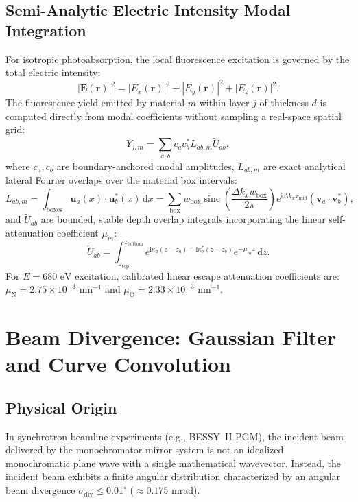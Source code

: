 \documentclass[11pt,a4paper]{article}
\newcommand{\E}{\mathbf{E}}
\newcommand{\ii}{\mathrm{i}}
\newcommand{\dd}{\mathrm{d}}
\begin{document}
\subsection{Semi-Analytic Electric Intensity Modal Integration}
For isotropic photoabsorption, the local fluorescence excitation is governed by the total electric intensity:
\begin{equation}
    |\E(\mathbf r)|^2 = |E_x(\mathbf r)|^2 + |E_y(\mathbf r)|^2 + |E_z(\mathbf r)|^2.
\end{equation}
The fluorescence yield emitted by material $m$ within layer $j$ of thickness $d$ is computed directly from modal coefficients without sampling a real-space spatial grid:
\begin{equation}
    Y_{j, m} = \sum_{a, b} c_a c_b^* L_{ab, m} \widetilde{U}_{ab},
\end{equation}
where $c_a, c_b$ are boundary-anchored modal amplitudes, $L_{ab, m}$ are exact analytical lateral Fourier overlaps over the material box intervals:
\begin{equation}
    L_{ab, m} = \int_{\mathrm{boxes}} \mathbf u_a(x) \cdot \mathbf u_b^*(x) \, \dd x = \sum_{\mathrm{box}} w_{\mathrm{box}} \operatorname{sinc}\left(\frac{\Delta k_x w_{\mathrm{box}}}{2\pi}\right) e^{\ii \Delta k_x x_{\mathrm{mid}}} (\mathbf v_a \cdot \mathbf v_b^*),
\end{equation}
and $\widetilde{U}_{ab}$ are bounded, stable depth overlap integrals incorporating the linear self-attenuation coefficient $\mu_m$:
\begin{equation}
    \widetilde{U}_{ab} = \int_{z_{\mathrm{top}}}^{z_{\mathrm{bottom}}} e^{\ii \kappa_a (z - z_a) - \ii \kappa_b^* (z - z_b)} e^{-\mu_m z} \, \dd z.
\end{equation}
For $E = 680\text{ eV}$ excitation, calibrated linear escape attenuation coefficients are:
$\mu_{\mathrm{N}} = 2.75 \times 10^{-3}\text{ nm}^{-1}$ and $\mu_{\mathrm{O}} = 2.33 \times 10^{-3}\text{ nm}^{-1}$.

\section{Beam Divergence: Gaussian Filter and Curve Convolution}

\subsection{Physical Origin}
In synchrotron beamline experiments (e.g., BESSY~II PGM), the incident beam delivered by the monochromator mirror system is not an idealized monochromatic plane wave with a single mathematical wavevector. Instead, the incident beam exhibits a finite angular distribution characterized by an angular beam divergence $\sigma_{\mathrm{div}} \le 0.01^\circ$ ($\approx 0.175\text{ mrad}$).
\end{document}
